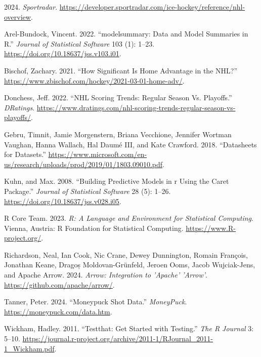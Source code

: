 \documentclass[
  letterpaper,
  DIV=11,
  numbers=noendperiod]{scrartcl}
\newlength{\cslhangindent}
\newenvironment{CSLReferences}[2] %
 {\begin{list}{}{%
  \setlength{\itemindent}{0pt}
  \setlength{\leftmargin}{0pt}
  \setlength{\parsep}{0pt}
  \ifodd #1
   \setlength{\leftmargin}{\cslhangindent}
   \setlength{\itemindent}{-1\cslhangindent}
  \fi
  \setlength{\itemsep}{#2\baselineskip}}}
 {\end{list}}
\begin{document}
\label{refs}
\begin{CSLReferences}{1}{0}
2024. \emph{Sportradar}.
\url{https://developer.sportradar.com/ice-hockey/reference/nhl-overview}.

Arel-Bundock, Vincent. 2022. {``{modelsummary}: Data and Model Summaries
in {R}.''} \emph{Journal of Statistical Software} 103 (1): 1--23.
\url{https://doi.org/10.18637/jss.v103.i01}.

Bischof, Zachary. 2021. {``How Significant Is Home Advantage in the
NHL?''} \url{https://www.zbischof.com/hockey/2021-03-01-home-adv/}.

Donchess, Jeff. 2022. {``NHL Scoring Trends: Regular Season Vs.
Playoffs.''} \emph{DRatings}.
\url{https://www.dratings.com/nhl-scoring-trends-regular-season-vs-playoffs/}.

Gebru, Timnit, Jamie Morgenstern, Briana Vecchione, Jennifer Wortman
Vaughan, Hanna Wallach, Hal Daumé III, and Kate Crawford. 2018.
{``Datasheets for Datasets.''}
\url{https://www.microsoft.com/en-us/research/uploads/prod/2019/01/1803.09010.pdf}.

Kuhn, and Max. 2008. {``Building Predictive Models in r Using the Caret
Package.''} \emph{Journal of Statistical Software} 28 (5): 1--26.
\url{https://doi.org/10.18637/jss.v028.i05}.

R Core Team. 2023. \emph{{R: A Language and Environment for Statistical
Computing}}. Vienna, Austria: R Foundation for Statistical Computing.
\url{https://www.R-project.org/}.

Richardson, Neal, Ian Cook, Nic Crane, Dewey Dunnington, Romain
François, Jonathan Keane, Dragoș Moldovan-Grünfeld, Jeroen Ooms, Jacob
Wujciak-Jens, and Apache Arrow. 2024. \emph{Arrow: Integration to
'Apache' 'Arrow'}. \url{https://github.com/apache/arrow/}.

Tanner, Peter. 2024. {``Moneypuck Shot Data.''} \emph{MoneyPuck}.
\url{https://moneypuck.com/data.htm}.

Wickham, Hadley. 2011. {``Testthat: Get Started with Testing.''}
\emph{The R Journal} 3: 5--10.
\url{https://journal.r-project.org/archive/2011-1/RJournal_2011-1_Wickham.pdf}.


\end{CSLReferences}
\end{document}
